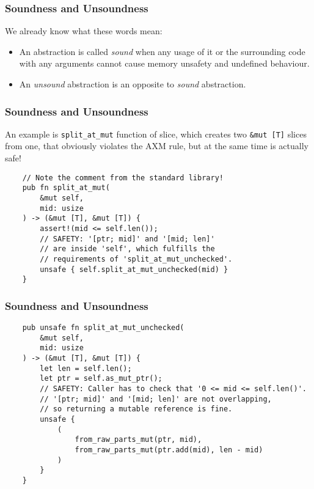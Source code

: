 \documentclass[aspectratio=1610,t]{beamer}
\begin{document}

\begin{frame}[fragile]
\frametitle{Soundness and Unsoundness}
We already know what these words mean:

\begin{itemize}
    \item An abstraction is called \textit{sound} when any usage of it or the surrounding code with any arguments cannot cause memory unsafety and undefined behaviour.
    \item An \textit{unsound} abstraction is an opposite to \textit{sound} abstraction.
\end{itemize}

\end{frame}


\begin{frame}[fragile]
\frametitle{Soundness and Unsoundness}
An example is \texttt{split\_at\_mut} function of slice, which creates two \texttt{\&mut [T]} slices from one, that obviously violates the AXM rule, but at the same time is actually safe!

\begin{verbatim}
    // Note the comment from the standard library!
    pub fn split_at_mut(
        &mut self,
        mid: usize
    ) -> (&mut [T], &mut [T]) {
        assert!(mid <= self.len());
        // SAFETY: '[ptr; mid]' and '[mid; len]'
        // are inside 'self', which fulfills the
        // requirements of 'split_at_mut_unchecked'.
        unsafe { self.split_at_mut_unchecked(mid) }
    }
\end{verbatim}
\end{frame}


\begin{frame}[fragile]
\frametitle{Soundness and Unsoundness}
\begin{verbatim}
    pub unsafe fn split_at_mut_unchecked(
        &mut self,
        mid: usize
    ) -> (&mut [T], &mut [T]) {
        let len = self.len();
        let ptr = self.as_mut_ptr();
        // SAFETY: Caller has to check that '0 <= mid <= self.len()'.
        // '[ptr; mid]' and '[mid; len]' are not overlapping,
        // so returning a mutable reference is fine.
        unsafe {
            (
                from_raw_parts_mut(ptr, mid),
                from_raw_parts_mut(ptr.add(mid), len - mid)
            )
        }
    }
\end{verbatim}
\end{frame}
\end{document}
